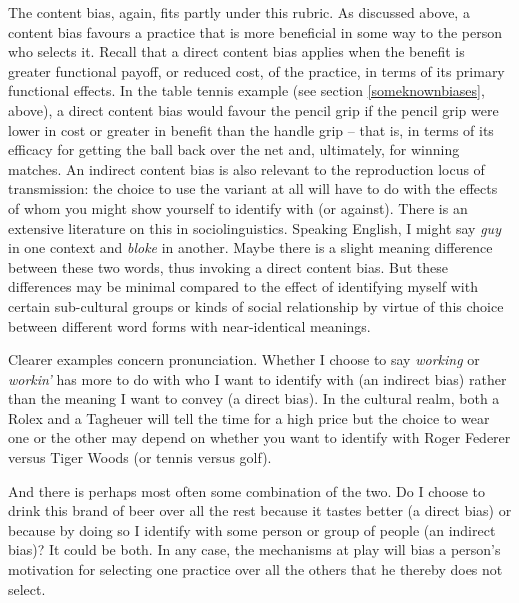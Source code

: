 The content bias,  again, fits partly under this 
rubric. As discussed above, a content bias favours a practice that is 
more beneficial in some way to the person who selects it. Recall that a direct content bias applies when the benefit is 
greater functional payoff, or reduced cost, of the practice, in 
terms of its primary functional effects. In the table tennis example (see section \ref{someknownbiases}, above), a direct content bias  would favour the pencil grip 
if the pencil grip were lower in cost or greater in benefit than the 
handle grip -- that is, in terms of its efficacy for getting the ball back 
over the net and, ultimately, for winning matches. An indirect content bias is also relevant to the reproduction locus of transmission: the choice to use the variant at all will have to do with the effects of whom you might show yourself to identify with (or against). There is an extensive literature on this in sociolinguistics. Speaking English, I might say \textit{guy} 
in one context and \textit{bloke} in another. Maybe there is 
a slight meaning difference between these two words, thus invoking a 
direct content bias. But these differences may be minimal compared to 
the effect of identifying myself with certain sub-cultural groups or 
kinds of social relationship by virtue of this choice between different 
word forms with near-identical meanings. 



Clearer examples concern pronunciation. Whether I choose to say \textit{working} or \textit{workin'} has more to do with who I want to identify with 
(an indirect bias) rather than the meaning I want to convey (a direct 
bias). In the cultural realm, both a Rolex and a Tagheuer will tell the 
time for a high price but the choice to wear one or the other may depend on whether you want to 
identify with Roger Federer versus Tiger Woods (or tennis 
versus golf). 



And there is perhaps most often some combination of the two. Do I choose 
to drink this brand of beer over all the rest because it tastes better 
(a direct bias) or because by doing so I identify with some person or 
group of people (an indirect bias)? It could be both. In any case, the 
mechanisms at play will bias a person's motivation for 
selecting one practice over all the others that he thereby does not 
select. 



